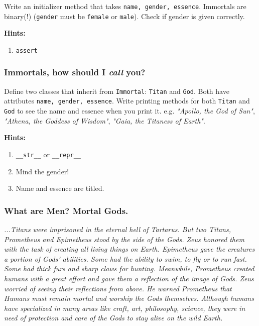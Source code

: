 \documentclass[a4paper]{article}
\begin{document}
Write an initializer method that takes \texttt{name, gender, essence}. Immortals are binary(!) (\texttt{gender} must be \texttt{female} or \texttt{male}). Check if gender is given correctly.

\textbf{Hints:}
\begin{enumerate}
    \item \texttt{assert}
\end{enumerate}

\subsubsection{Immortals, how should I \textit{call} you?}

Define two classes that inherit from \texttt{Immortal}: \texttt{Titan} and \texttt{God}. Both have attributes \texttt{name, gender, essence}. Write printing methods for both \texttt{Titan} and \texttt{God} to see the name and essence when you print it. e.g. \textit{"Apollo, the God of Sun"}, \textit{"Athena, the Goddess of Wisdom"}, \textit{"Gaia, the Titaness of Earth"}.

\textbf{Hints:}
\begin{enumerate}
    \item \texttt{\_\_str\_\_} or \texttt{\_\_repr\_\_}
    \item Mind the gender!
    \item Name and essence are titled.
\end{enumerate}

\subsubsection{What are Men? Mortal Gods.}

\textit{...Titans were imprisoned in the eternal hell of Tartarus. But two Titans, Prometheus and Epimetheus stood by the side of the Gods. Zeus honored them with the task of creating all living things on Earth. Epimetheus gave the creatures a portion of Gods' abilities. Some had the ability to swim, to fly or to run fast. Some had thick furs and sharp claws for hunting. Meanwhile, Prometheus created humans with a great effort and gave them a reflection of the image of Gods. Zeus worried of seeing their reflections from above. He warned Prometheus that Humans must remain mortal and worship the Gods themselves. Although humans have specialized in many areas like craft, art, philosophy, science, they were in need of protection and care of the Gods to stay alive on the wild Earth.}
\end{document}
